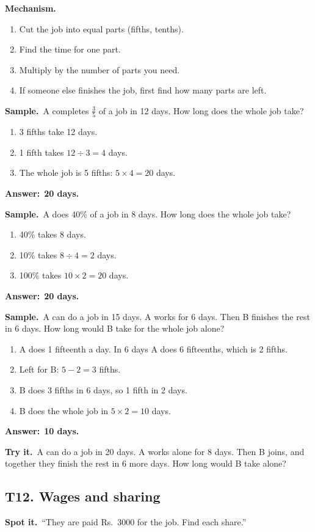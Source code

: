 \documentclass[11pt,a4paper]{article}
\let\oldsubsection\subsection
\renewcommand{\subsection}{\needspace{9\baselineskip}\oldsubsection}
\newcommand{\spot}{\textbf{\color{ember}Spot it.}\ }
\newcommand{\mech}{\textbf{\color{ember}Mechanism.}\ }
\newif\ifkeepsamp
\newcommand{\ans}[1]{\par\nopagebreak\noindent\textbf{\color{ember}Answer:}\ \textbf{#1}\par}
\newcommand{\samp}{\ifkeepsamp\needspace{4\baselineskip}\fi\textbf{\color{ember}Sample.}\ }
\newcommand{\tryit}[1]{\textbf{\color{ember}Try it.}\ #1}
\begin{document}
\mech
\begin{enumerate}
\item Cut the job into equal parts (fifths, tenths).
\item Find the time for one part.
\item Multiply by the number of parts you need.
\item If someone else finishes the job, first find how many parts are left.
\end{enumerate}

\samp A completes $\tfrac35$ of a job in 12 days. How long does the whole job take?
\begin{enumerate}
\item 3 fifths take 12 days.
\item 1 fifth takes $12 \div 3 = 4$ days.
\item The whole job is 5 fifths: $5 \times 4 = 20$ days.
\end{enumerate}
\ans{20 days.}

\samp A does 40\% of a job in 8 days. How long does the whole job take?
\begin{enumerate}
\item 40\% takes 8 days.
\item 10\% takes $8 \div 4 = 2$ days.
\item 100\% takes $10 \times 2 = 20$ days.
\end{enumerate}
\ans{20 days.}

\samp A can do a job in 15 days. A works for 6 days. Then B finishes the rest in 6 days. How long would B take for the whole job alone?
\begin{enumerate}
\item A does 1 fifteenth a day. In 6 days A does 6 fifteenths, which is 2 fifths.
\item Left for B: $5 - 2 = 3$ fifths.
\item B does 3 fifths in 6 days, so 1 fifth in 2 days.
\item B does the whole job in $5 \times 2 = 10$ days.
\end{enumerate}
\ans{10 days.}

\tryit A can do a job in 20 days. A works alone for 8 days. Then B joins, and together they finish the rest in 6 more days. How long would B take alone?

\subsection{T12. Wages and sharing}
\spot ``They are paid Rs.\ 3000 for the job. Find each share.''
\end{document}
